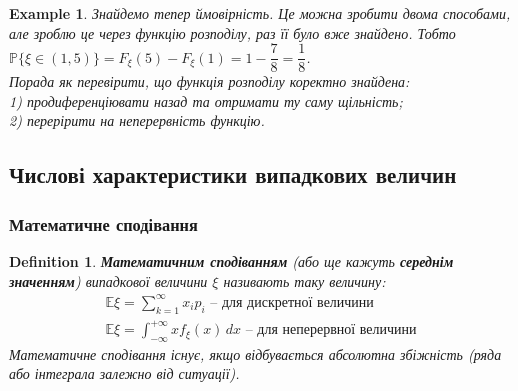 \documentclass[a4paper, 10pt]{article}
\theoremstyle{theoremdd}
\newtheorem{definition}[theorem]{Definition}
\newtheorem{example}[theorem]{Example}
\begin{document}
\begin{example}
Знайдемо тепер ймовірність. Це можна зробити двома способами, але зроблю це через функцію розподілу, раз її було вже знайдено. Тобто $\mathbb{P}\{\xi \in (1,5)\} = F_\xi(5) - F_\xi(1) = 1 - \dfrac{7}{8} = \dfrac{1}{8}$.
\bigskip \\
Порада як перевірити, що функція розподілу коректно знайдена:\\
1) продиференціювати назад та отримати ту саму щільність;\\
2) перерірити на неперервність функцію.
\end{example}

\subsection{Числові характеристики випадкових величин}
\subsubsection{Математичне сподівання}
\begin{definition}
\textbf{Математичним сподіванням} (або ще кажуть \textbf{середнім значенням}) випадкової величини $\xi$ називають таку величину:
\begin{align*}
\mathbb{E}\xi = \displaystyle\sum_{k=1}^\infty x_i p_i \text{ -- для дискретної величини} \\
\mathbb{E}\xi = \int_{-\infty}^{+\infty} x f_\xi(x)\,dx \text{ -- для неперервної величини}
\end{align*}
Математичне сподівання існує, якщо відбувається абсолютна збіжність (ряда або інтеграла залежно від ситуації).
\end{definition}
\end{document}
